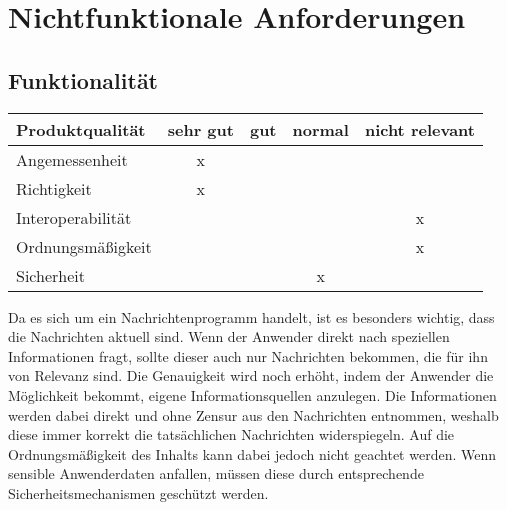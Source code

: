 

\chapter{Nichtfunktionale Anforderungen}

\section{Funktionalität}
\begin{tabular}{|l|c|c|c|c|}
	\hline
	\textbf{Produktqualität} & \textbf{sehr gut} & \textbf{gut} & \textbf{normal} & \textbf{nicht relevant} \\ \hline
	Angemessenheit           &         x         &              &                 &                         \\ \hline
	Richtigkeit              &         x         &              &                 &                         \\ \hline
	Interoperabilität        &                   &              &                 &             x            \\ \hline
	Ordnungsmäßigkeit        &                   &              &                 &             x          \\ \hline
	Sicherheit		 		 &                   &              &         x       &                         \\ \hline
\end{tabular}

	Da es sich um ein Nachrichtenprogramm handelt, ist es besonders wichtig, dass die Nachrichten aktuell sind.
	Wenn der Anwender direkt nach speziellen Informationen fragt, sollte dieser auch nur Nachrichten bekommen, die für ihn von Relevanz sind.
	Die Genauigkeit wird noch erhöht, indem der Anwender die Möglichkeit bekommt, eigene Informationsquellen anzulegen.
	Die Informationen werden dabei direkt und ohne Zensur aus den Nachrichten entnommen, weshalb diese immer korrekt die tatsächlichen Nachrichten widerspiegeln.
	Auf die Ordnungsmäßigkeit des Inhalts kann dabei jedoch nicht geachtet werden.
	Wenn sensible Anwenderdaten anfallen, müssen diese durch entsprechende Sicherheitsmechanismen geschützt werden.
	
